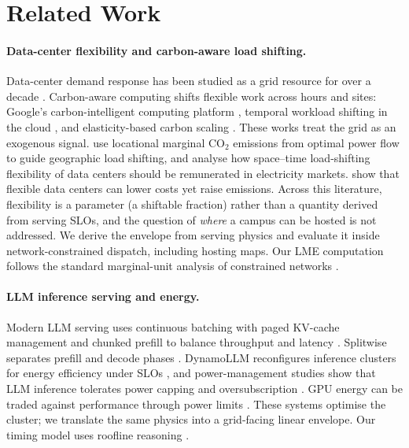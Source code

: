 \documentclass{article} %
\begin{document}
\section{Related Work}
\label{sec:related_work}
\paragraph{Data-center flexibility and carbon-aware load shifting.} Data-center demand response has been studied as a grid resource for over a decade \citep{wierman2014opportunities}. Carbon-aware computing shifts flexible work across hours and sites: Google's carbon-intelligent computing platform \citep{radovanovic2023carbon}, temporal workload shifting in the cloud \citep{wiesner2021letswait}, and elasticity-based carbon scaling \citep{hanafy2024carbonscaler}. These works treat the grid as an exogenous signal. \citet{lindberg2021environmental} use locational marginal CO$_2$ emissions from optimal power flow to guide geographic load shifting, and \citet{zhang2022remunerating} analyse how space--time load-shifting flexibility of data centers should be remunerated in electricity markets. \citet{knittel2025flexible} show that flexible data centers can lower costs yet raise emissions. Across this literature, flexibility is a parameter (a shiftable fraction) rather than a quantity derived from serving SLOs, and the question of \emph{where} a campus can be hosted is not addressed. We derive the envelope from serving physics and evaluate it inside network-constrained dispatch, including hosting maps. Our LME computation follows the standard marginal-unit analysis of constrained networks \citep{ruiz2010marginal}.

\paragraph{LLM inference serving and energy.} Modern LLM serving uses continuous batching with paged KV-cache management \citep{kwon2023pagedattention} and chunked prefill to balance throughput and latency \citep{agrawal2024sarathi}. Splitwise separates prefill and decode phases \citep{patel2024splitwise}. DynamoLLM reconfigures inference clusters for energy efficiency under SLOs \citep{stojkovic2025dynamollm}, and power-management studies show that LLM inference tolerates power capping and oversubscription \citep{patel2024characterizing}. GPU energy can be traded against performance through power limits \citep{you2023zeus}. These systems optimise the cluster; we translate the same physics into a grid-facing linear envelope. Our timing model uses roofline reasoning \citep{williams2009roofline}.
\end{document}
